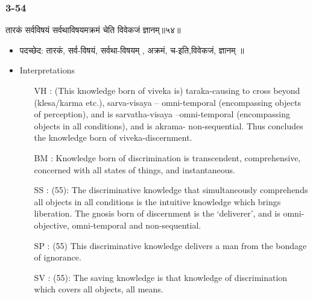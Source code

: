 \begin{frame}[fragile]\frametitle{3-54}
\begin{sanskrit}
तारकं सर्वविषयं सर्वथाविषयमक्रमं चेति विवेकजं ज्ञानम्॥५४॥
\end{sanskrit}

	\begin{itemize}
	\item पदच्छेद:  तारकं, सर्व-विषयं, सर्वथा-विषयम् , अक्रमं, च-इति,विवेकजं, ज्ञानम् ॥
	\item Interpretations
		\begin{itemize}	
		\item [VH]: (This knowledge born of viveka is) taraka-causing to cross beyond (klesa/karma etc.), sarva-visaya – omni-temporal (encompassing objects of perception), and is sarvatha-visaya –omni-temporal (encompassing objects in all conditions), and is akrama- non-sequential. Thus concludes the knowledge born of viveka-discernment.
		\item [BM]: Knowledge born of discrimination is transcendent, comprehensive, concerned with all states of things, and instantaneous.
		\item [SS]: (55): The discriminative knowledge that simultaneously comprehends all objects in all conditions is the intuitive knowledge which brings liberation. The gnosis born of discernment is the ‘deliverer’, and is omni-objective, omni-temporal and non-sequential.
		\item [SP]: (55) This discriminative knowledge delivers a man from the bondage of ignorance.
		\item [SV]: (55): The saving knowledge is that knowledge of discrimination which covers all objects, all means. 
		\end{itemize}
	\end{itemize}
\end{frame}


